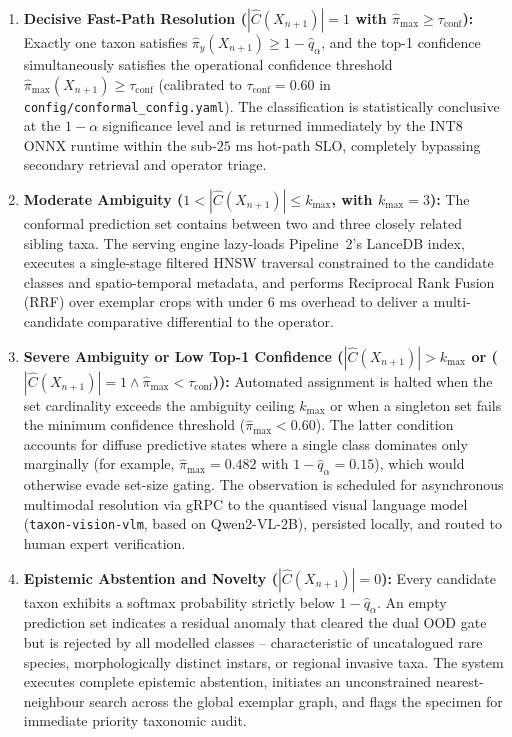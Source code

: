 \begin{enumerate}
    \item \textbf{Decisive Fast-Path Resolution ($|\hat{C}(X_{n+1})| = 1$ with $\hat{\pi}_{\max} \ge \tau_{\text{conf}}$):} Exactly one taxon satisfies $\hat{\pi}_y(X_{n+1}) \ge 1 - \hat{q}_\alpha$, and the top-1 confidence simultaneously satisfies the operational confidence threshold $\hat{\pi}_{\max}(X_{n+1}) \ge \tau_{\text{conf}}$ (calibrated to $\tau_{\text{conf}} = 0.60$ in \nolinkurl{config/conformal_config.yaml}). The classification is statistically conclusive at the $1 - \alpha$ significance level and is returned immediately by the INT8 ONNX runtime within the sub-$25\text{ ms}$ hot-path SLO, completely bypassing secondary retrieval and operator triage.
    \item \textbf{Moderate Ambiguity ($1 < |\hat{C}(X_{n+1})| \le k_{\max}$, with $k_{\max} = 3$):} The conformal prediction set contains between two and three closely related sibling taxa. The serving engine lazy-loads Pipeline~2's LanceDB index, executes a single-stage filtered HNSW traversal constrained to the candidate classes and spatio-temporal metadata, and performs Reciprocal Rank Fusion (RRF) over exemplar crops with under $6\text{ ms}$ overhead to deliver a multi-candidate comparative differential to the operator.
    \item \textbf{Severe Ambiguity or Low Top-1 Confidence ($|\hat{C}(X_{n+1})| > k_{\max}$ or ($|\hat{C}(X_{n+1})| = 1 \land \hat{\pi}_{\max} < \tau_{\text{conf}}$)):} Automated assignment is halted when the set cardinality exceeds the ambiguity ceiling $k_{\max}$ or when a singleton set fails the minimum confidence threshold ($\hat{\pi}_{\max} < 0.60$). The latter condition accounts for diffuse predictive states where a single class dominates only marginally (for example, $\hat{\pi}_{\max} = 0.482$ with $1 - \hat{q}_\alpha = 0.15$), which would otherwise evade set-size gating. The observation is scheduled for asynchronous multimodal resolution via gRPC to the quantised visual language model (\texttt{taxon-vision-vlm}, based on Qwen2-VL-2B), persisted locally, and routed to human expert verification.
    \item \textbf{Epistemic Abstention and Novelty ($|\hat{C}(X_{n+1})| = 0$):} Every candidate taxon exhibits a softmax probability strictly below $1 - \hat{q}_\alpha$. An empty prediction set indicates a residual anomaly that cleared the dual OOD gate but is rejected by all modelled classes -- characteristic of uncatalogued rare species, morphologically distinct instars, or regional invasive taxa. The system executes complete epistemic abstention, initiates an unconstrained nearest-neighbour search across the global exemplar graph, and flags the specimen for immediate priority taxonomic audit.
\end{enumerate}

